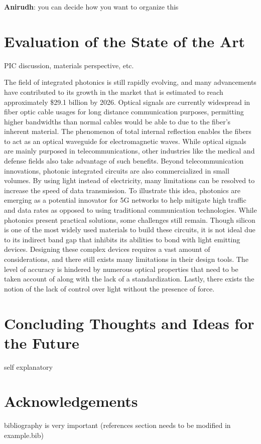 \documentclass[10pt]{article}
\begin{document}
\textbf{Anirudh}: you can decide how you want to organize this 

\section{Evaluation of the State of the Art}

PIC discussion, materials perspective, etc.

The field of integrated photonics is still rapidly evolving, and many advancements have contributed to its growth in the market that is estimated to reach approximately \$29.1 billion by 2026. Optical signals are currently widespread in fiber optic cable usages for long distance communication purposes, permitting higher bandwidths than normal cables would be able to due to the fiber’s inherent material. The phenomenon of total internal reflection enables the fibers to act as an optical waveguide for electromagnetic waves. While optical signals are mainly purposed in telecommunications, other industries like the medical and defense fields also take advantage of such benefits. Beyond telecommunication innovations, photonic integrated circuits are also commercialized in small volumes. By using light instead of electricity, many limitations can be resolved to increase the speed of data transmission. To illustrate this idea, photonics are emerging as a potential innovator for 5G networks to help mitigate high traffic and data rates as opposed to using traditional communication technologies. While photonics present practical solutions, some challenges still remain. Though silicon is one of the most widely used materials to build these circuits, it is not ideal due to its indirect band gap that inhibits its abilities to bond with light emitting devices. Designing these complex devices requires a vast amount of considerations, and there still exists many limitations in their design tools. The level of accuracy is hindered by numerous optical properties that need to be taken account of along with the lack of a standardization. Lastly, there exists the notion of the lack of control over light without the presence of force.



\section{Concluding Thoughts and Ideas for the Future}

self explanatory 




\section{Acknowledgements}

bibliography is very important (references section needs to be modified in example.bib)

\end{document}

